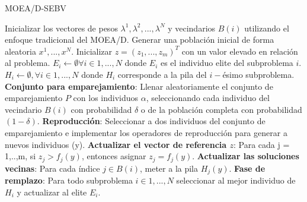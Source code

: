 \begin{algorithm}[H]
\caption{MOEA/D-SEBV}
\label{alg:MOEAD_SEBV}
\begin{scriptsize}
\begin{algorithmic}[1]
    \STATE Inicializar los vectores de pesos $\lambda^1, \lambda^2, ..., \lambda^N$ y vecindarios $B(i)$ utilizando el enfoque tradicional del MOEA/D. \label{alg:Inicializar_Vectores_Pesos}
    \STATE Generar una población inicial de forma aleatoria $x^1, ..., x^N$.
    \STATE Inicializar $z = (z_1, ..., z_m)^T$ con un valor elevado en relación al problema. \label{alg:Inicializar_Referencia}
    \STATE $E_i \leftarrow \emptyset \forall i \in 1,...,N$ donde $E_i$ es el individuo elite del subproblema $i$. \label{alg:iniciar_elite}
   \label{alg:iniciagen}
    \STATE $H_i  \leftarrow \emptyset, \forall i \in 1, ..., N$ donde $H_i$ corresponde a la pila del $i-$ésimo subproblema. \label{alg:limipar_pila}
    \STATE \textbf{Conjunto para emparejamiento}: Llenar aleatoriamente el conjunto de emparejamiento $P$ con los individuos $\alpha$, seleccionando cada individuo del vecindario $B(i)$ con probabilidad $\delta$ o de la población completa con probabilidad $(1 - \delta)$. \label{alg:Emparejamiento}
    \STATE \textbf{Reproducción}: Seleccionar a dos individuos del conjunto de emparejamiento e implementar los operadores de reproducción para generar a nuevos individuos (y). 
    \STATE \textbf{Actualizar el vector de referencia $z$}: Para cada j = 1,..,m, si $z_j > f_j(y)$, entonces asignar $z_j = f_j(y)$.
    \STATE \textbf{Actualizar las soluciones vecinas}: Para cada índice $j \in B(i)$, meter a la pila $H_j(y)$. \label{alg:almacenar_soluciones}
    \ENDFOR
    \STATE \textbf{Fase de remplazo}: Para todo subproblema $i \in 1, ..., N$ seleccionar al mejor individuo de $H_i$ y actualizar al elite $E_i$. \label{alg:remplazo_moea}
  \ENDWHILE \label{alg:terminagen}
\end{algorithmic}
\end{scriptsize}
\end{algorithm}


